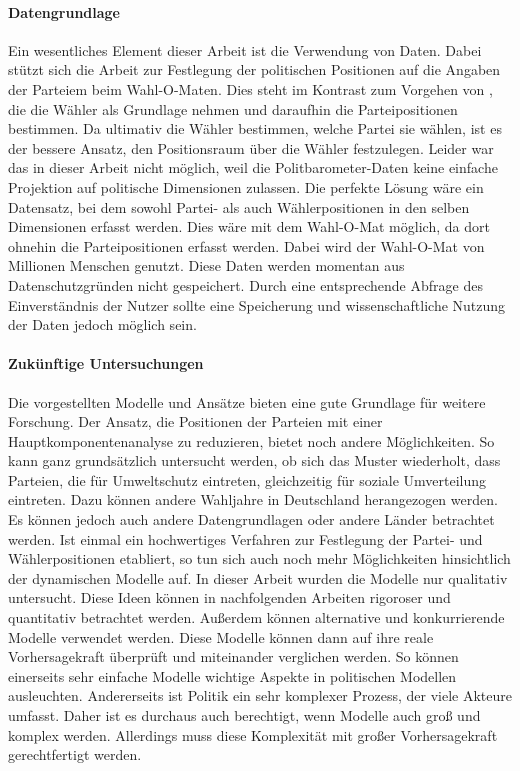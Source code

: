 \paragraph{Datengrundlage}
Ein wesentliches Element dieser Arbeit ist die Verwendung von Daten. Dabei stützt sich die Arbeit zur Festlegung der politischen Positionen auf die Angaben der Parteiem beim Wahl-O-Maten. Dies steht im Kontrast zum Vorgehen von \citet{schofield1998germany}, die die Wähler als Grundlage nehmen und daraufhin die Parteipositionen bestimmen. Da ultimativ die Wähler bestimmen, welche Partei sie wählen, ist es der bessere Ansatz, den Positionsraum über die Wähler festzulegen. Leider war das in dieser Arbeit nicht möglich, weil die Politbarometer-Daten keine einfache Projektion auf politische Dimensionen zulassen. Die perfekte Lösung wäre ein Datensatz, bei dem sowohl Partei- als auch Wählerpositionen in den selben Dimensionen erfasst werden. Dies wäre mit dem Wahl-O-Mat möglich, da dort ohnehin die Parteipositionen erfasst werden. Dabei wird der Wahl-O-Mat von Millionen Menschen genutzt. Diese Daten werden momentan aus Datenschutzgründen nicht gespeichert. Durch eine entsprechende Abfrage des Einverständnis der Nutzer sollte eine Speicherung und wissenschaftliche Nutzung der Daten jedoch möglich sein.

\paragraph{Zukünftige Untersuchungen}
Die vorgestellten Modelle und Ansätze bieten eine gute Grundlage für weitere Forschung. Der Ansatz, die Positionen der Parteien mit einer Hauptkomponentenanalyse zu reduzieren, bietet noch andere Möglichkeiten. So kann ganz grundsätzlich untersucht werden, ob sich das Muster wiederholt, dass Parteien, die für Umweltschutz eintreten, gleichzeitig für soziale Umverteilung eintreten. Dazu können andere Wahljahre in Deutschland herangezogen werden. Es können jedoch auch andere Datengrundlagen oder andere Länder betrachtet werden.
Ist einmal ein hochwertiges Verfahren zur Festlegung der Partei- und Wählerpositionen etabliert, so tun sich auch noch mehr Möglichkeiten hinsichtlich der dynamischen Modelle auf. In dieser Arbeit wurden die Modelle nur qualitativ untersucht. Diese Ideen können in nachfolgenden Arbeiten rigoroser und quantitativ betrachtet werden.
Außerdem können alternative und konkurrierende Modelle verwendet werden. Diese Modelle können dann auf ihre reale Vorhersagekraft überprüft und miteinander verglichen werden. So können einerseits sehr einfache Modelle wichtige Aspekte in politischen Modellen ausleuchten.
Andererseits ist Politik ein sehr komplexer Prozess, der viele Akteure umfasst. Daher ist es durchaus auch berechtigt, wenn Modelle auch groß und komplex werden. Allerdings muss diese Komplexität mit großer Vorhersagekraft gerechtfertigt werden.

\cleardoublepage